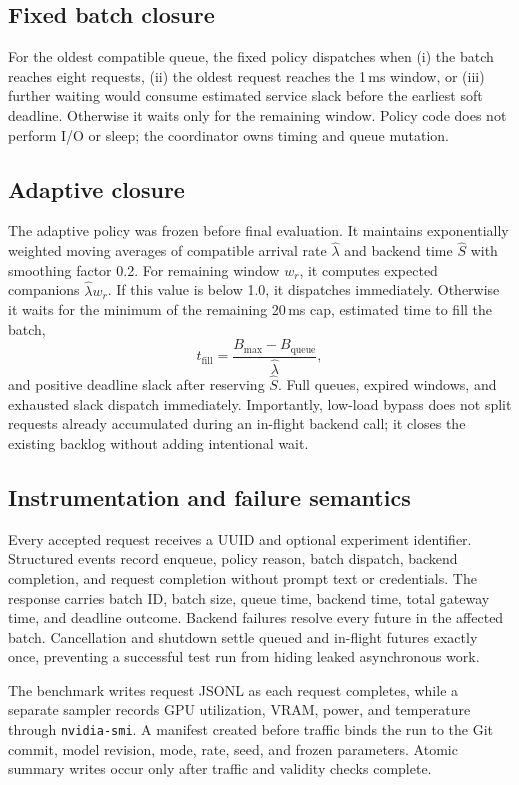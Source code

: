 \subsection{Fixed batch closure}

For the oldest compatible queue, the fixed policy dispatches when (i) the batch
reaches eight requests, (ii) the oldest request reaches the 1\,ms window, or
(iii) further waiting would consume estimated service slack before the earliest
soft deadline. Otherwise it waits only for the remaining window. Policy code
does not perform I/O or sleep; the coordinator owns timing and queue mutation.

\subsection{Adaptive closure}

The adaptive policy was frozen before final evaluation. It maintains
exponentially weighted moving averages of compatible arrival rate $\hat\lambda$
and backend time $\hat S$ with smoothing factor 0.2. For remaining window
$w_r$, it computes expected companions $\hat\lambda w_r$. If this value is
below 1.0, it dispatches immediately. Otherwise it waits for the minimum of
the remaining 20\,ms cap, estimated time to fill the batch,
\begin{equation}
  t_{\mathrm{fill}}=
  \frac{B_{\max}-B_{\mathrm{queue}}}{\hat\lambda},
\end{equation}
and positive deadline slack after reserving $\hat S$. Full queues, expired
windows, and exhausted slack dispatch immediately. Importantly, low-load
bypass does not split requests already accumulated during an in-flight backend
call; it closes the existing backlog without adding intentional wait.

\subsection{Instrumentation and failure semantics}

Every accepted request receives a UUID and optional experiment identifier.
Structured events record enqueue, policy reason, batch dispatch, backend
completion, and request completion without prompt text or credentials. The
response carries batch ID, batch size, queue time, backend time, total gateway
time, and deadline outcome. Backend failures resolve every future in the
affected batch. Cancellation and shutdown settle queued and in-flight futures
exactly once, preventing a successful test run from hiding leaked asynchronous
work.

The benchmark writes request JSONL as each request completes, while a separate
sampler records GPU utilization, VRAM, power, and temperature through
\texttt{nvidia-smi}. A manifest created before traffic binds the run to the
Git commit, model revision, mode, rate, seed, and frozen parameters. Atomic
summary writes occur only after traffic and validity checks complete.
